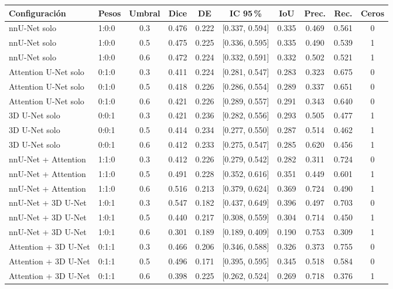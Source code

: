 \footnotesize
\begin{tabular}{llccccccc c}
\toprule
Configuración & Pesos & Umbral & Dice & DE & IC 95\,\% & IoU & Prec. & Rec. & Ceros \\
\midrule
nnU-Net solo & 1:0:0 & 0.3 & 0.476 & 0.222 & [0.337, 0.594] & 0.335 & 0.469 & 0.561 & 0 \\
nnU-Net solo & 1:0:0 & 0.5 & 0.475 & 0.225 & [0.336, 0.595] & 0.335 & 0.490 & 0.539 & 1 \\
nnU-Net solo & 1:0:0 & 0.6 & 0.472 & 0.224 & [0.332, 0.591] & 0.332 & 0.502 & 0.521 & 1 \\
Attention U-Net solo & 0:1:0 & 0.3 & 0.411 & 0.224 & [0.281, 0.547] & 0.283 & 0.323 & 0.675 & 0 \\
Attention U-Net solo & 0:1:0 & 0.5 & 0.418 & 0.226 & [0.286, 0.554] & 0.289 & 0.337 & 0.651 & 0 \\
Attention U-Net solo & 0:1:0 & 0.6 & 0.421 & 0.226 & [0.289, 0.557] & 0.291 & 0.343 & 0.640 & 0 \\
3D U-Net solo & 0:0:1 & 0.3 & 0.421 & 0.236 & [0.282, 0.556] & 0.293 & 0.505 & 0.477 & 1 \\
3D U-Net solo & 0:0:1 & 0.5 & 0.414 & 0.234 & [0.277, 0.550] & 0.287 & 0.514 & 0.462 & 1 \\
3D U-Net solo & 0:0:1 & 0.6 & 0.412 & 0.233 & [0.275, 0.547] & 0.285 & 0.620 & 0.456 & 1 \\
\addlinespace
nnU-Net + Attention & 1:1:0 & 0.3 & 0.412 & 0.226 & [0.279, 0.542] & 0.282 & 0.311 & 0.724 & 0 \\
nnU-Net + Attention & 1:1:0 & 0.5 & 0.491 & 0.228 & [0.352, 0.616] & 0.351 & 0.449 & 0.601 & 1 \\
nnU-Net + Attention & 1:1:0 & 0.6 & 0.516 & 0.213 & [0.379, 0.624] & 0.369 & 0.724 & 0.490 & 1 \\
nnU-Net + 3D U-Net & 1:0:1 & 0.3 & 0.547 & 0.182 & [0.437, 0.649] & 0.396 & 0.497 & 0.703 & 0 \\
nnU-Net + 3D U-Net & 1:0:1 & 0.5 & 0.440 & 0.217 & [0.308, 0.559] & 0.304 & 0.714 & 0.450 & 1 \\
nnU-Net + 3D U-Net & 1:0:1 & 0.6 & 0.301 & 0.189 & [0.189, 0.409] & 0.190 & 0.753 & 0.309 & 1 \\
Attention + 3D U-Net & 0:1:1 & 0.3 & 0.466 & 0.206 & [0.346, 0.588] & 0.326 & 0.373 & 0.755 & 0 \\
Attention + 3D U-Net & 0:1:1 & 0.5 & 0.496 & 0.171 & [0.395, 0.595] & 0.345 & 0.518 & 0.584 & 0 \\
Attention + 3D U-Net & 0:1:1 & 0.6 & 0.398 & 0.225 & [0.262, 0.524] & 0.269 & 0.718 & 0.376 & 1 \\

\end{tabular}
